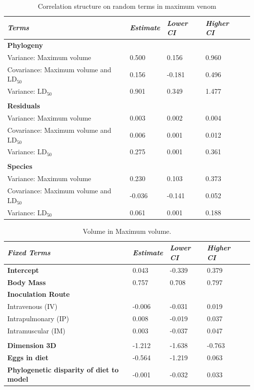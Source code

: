 \begin{table}[h!]
  \centering
    \caption[Table 4.]{Correlation structure on random terms in maximum venom}
\begin{tabular}{*5l}    \toprule
\emph{Terms} & \emph{Estimate} & \emph{Lower CI} & \emph{Higher CI}\\\midrule
\textbf{Phylogeny} &   &   &  \\ 
Variance: Maximum volume & 0.500 & 0.156 & 0.960 \\
Covariance: Maximum volume and LD$_{50}$ & 0.156  & -0.181  & 0.496 \\
Variance: LD$_{50}$ & 0.901 & 0.349 & 1.477 \\

 &   &   &  \\

\textbf{Residuals} &   &   &  \\ 
Variance: Maximum volume & 0.003 & 0.002 & 0.004 \\
Covariance: Maximum volume and LD$_{50}$ & 0.006  & 0.001  & 0.012 \\
Variance: LD$_{50}$ & 0.275 & 0.001 & 0.361 \\

 &   &   &  \\ 

\textbf{Species} &   &   &  \\ 
Variance: Maximum volume & 0.230 & 0.103 & 0.373 \\
Covariance: Maximum volume and LD$_{50}$ & -0.036  & -0.141  & 0.052 \\
Variance: LD$_{50}$ & 0.061 & 0.001 & 0.188 \\\bottomrule
 \hline
\end{tabular}
  \label{tbl:Table 4.}
\end{table}


\begin{table}[h!]
  \centering
    \caption[Table 5.]{Volume in Maximum volume.}
\begin{tabular}{*5l}    \toprule
\emph{Fixed Terms} & \emph{Estimate} & \emph{Lower CI} & \emph{Higher CI}\\\midrule
\textbf{Intercept} & 0.043  & -0.339 & 0.379 \\ 
\textbf{Body Mass} & 0.757  & 0.708 & 0.797 \\ 
\textbf{Inoculation Route} &  &  &  \\ 
 Intravenous (IV) & -0.006 & -0.031 & 0.019 \\
 Intrapulmonary (IP) & 0.008 & -0.019 & 0.037 \\ 
 Intramuscular (IM) & 0.003 & -0.037 & 0.047 \\
  &  &  &  \\ 
\textbf{Dimension 3D} & -1.212 & -1.638 & -0.763 \\ 
\textbf{Eggs in diet} & -0.564 & -1.219 & 0.063 \\ 
\textbf{Phylogenetic disparity of diet to model} & -0.001 & -0.032 & 0.033 \\\bottomrule
 \hline
\end{tabular}
  \label{tbl:Table 5.}
\end{table}



